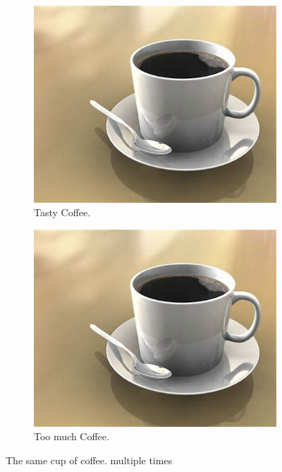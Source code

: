 \documentclass{article}
\begin{document}
\begin{figure}[h!]
\begin{subfigure}[b]{0.2\linewidth}
	   	\includegraphics[width=\linewidth]{coffee.jpg}
	   	\caption{Tasty Coffee.}
	   \end{subfigure}
       	\begin{subfigure}[b]{0.5\linewidth}
       	\includegraphics[width=\linewidth]{coffee.jpg}
       	\caption{Too much Coffee.}
       \end{subfigure}
		\caption{The same cup of coffee. multiple times}
	\end{figure}
\end{document}
